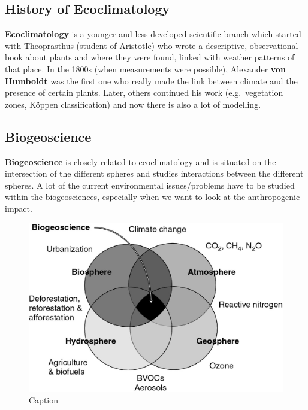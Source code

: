 \documentclass[12pt,oneside]{book}
\begin{document}
\subsection{History of Ecoclimatology}\label{history-of-ecoclimatology}

\textbf{Ecoclimatology} is a younger and less developed scientific
branch which started with Theoprasthus (student of Aristotle) who wrote
a descriptive, observational book about plants and where they were
found, linked with weather patterns of that place. In the 1800s (when
measurements were possible), Alexander \textbf{von Humboldt} was the
first one who really made the link between climate and the presence of
certain plants. Later, others continued his work (e.g.~vegetation zones,
Köppen classification) and now there is also a lot of modelling.

\subsection{Biogeoscience}\label{biogeoscience}

\textbf{Biogeoscience} is closely related to ecoclimatology and is
situated on the intersection of the different spheres and studies
interactions between the different spheres. A lot of the current
environmental issues/problems have to be studied within the
biogeosciences, especially when we want to look at the anthropogenic
impact.

\begin{figure}

{\centering \includegraphics[width=0.5\linewidth]{figures/Figure19} 

}

\caption{Caption}\label{fig:Biogeoscience}
\end{figure}
\end{document}
